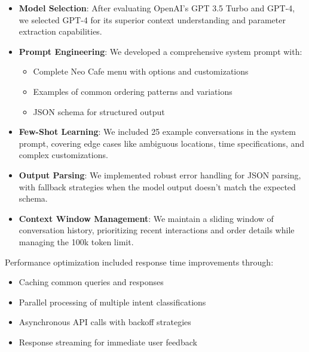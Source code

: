 \documentclass[12pt]{article}
\begin{document}
\begin{itemize}
    \item \textbf{Model Selection}: After evaluating OpenAI's GPT 3.5 Turbo and GPT-4, we selected GPT-4 for its superior context understanding and parameter extraction capabilities. 
    
    
    \item \textbf{Prompt Engineering}: We developed a comprehensive system prompt with:
    \begin{itemize}
        \item Complete Neo Cafe menu with options and customizations
        \item Examples of common ordering patterns and variations
        \item JSON schema for structured output
    \end{itemize}
    
    \item \textbf{Few-Shot Learning}: We included 25 example conversations in the system prompt, covering edge cases like ambiguous locations, time specifications, and complex customizations.
    
    \item \textbf{Output Parsing}: We implemented robust error handling for JSON parsing, with fallback strategies when the model output doesn't match the expected schema.
    
    \item \textbf{Context Window Management}: We maintain a sliding window of conversation history, prioritizing recent interactions and order details while managing the 100k token limit.
\end{itemize}

Performance optimization included response time improvements through:
\begin{itemize}
    \item Caching common queries and responses
    \item Parallel processing of multiple intent classifications
    \item Asynchronous API calls with backoff strategies
    \item Response streaming for immediate user feedback
\end{itemize}
\end{document}
